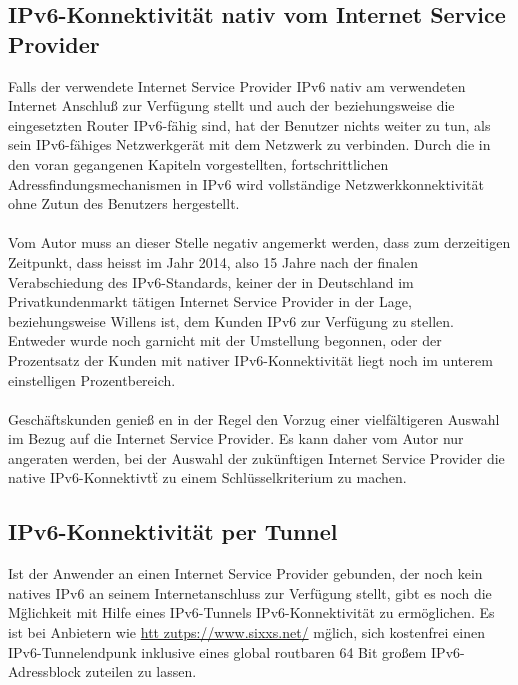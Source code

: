 \documentclass[a4paper,12pt]{scrartcl}
\begin{document}
\subsection{IPv6-Konnektivit\"at nativ vom Internet Service Provider}
Falls der verwendete Internet Service Provider IPv6 nativ am verwendeten Internet Anschlu{\ss} zur Verf\"ugung stellt und auch der beziehungsweise die eingesetzten Router IPv6-f\"ahig sind, hat der Benutzer nichts weiter zu tun, als sein IPv6-f\"ahiges Netzwerkger\"at mit dem Netzwerk zu verbinden. Durch die in den voran gegangenen Kapiteln vorgestellten, fortschrittlichen Adressfindungsmechanismen in IPv6 wird vollst\"andige Netzwerkkonnektivit\"at ohne Zutun des Benutzers hergestellt.\\
\\
Vom Autor muss an dieser Stelle negativ angemerkt werden, dass zum derzeitigen Zeitpunkt, dass heisst im Jahr 2014, also 15 Jahre nach der finalen Verabschiedung des IPv6-Standards,  keiner der in Deutschland im Privatkundenmarkt t\"atigen Internet Service Provider in der Lage, beziehungsweise Willens ist, dem Kunden IPv6 zur Verf\"ugung zu stellen. Entweder wurde noch garnicht mit der Umstellung begonnen, oder der Prozentsatz der Kunden mit nativer IPv6-Konnektivit\"at liegt noch im unterem einstelligen Prozentbereich.\\
\\
Gesch\"aftskunden genie{\ss} en in der Regel den Vorzug einer vielf\"altigeren Auswahl im Bezug auf die Internet Service Provider. Es kann daher vom Autor nur angeraten werden, bei der Auswahl der zuk\"unftigen Internet Service Provider die native IPv6-Konnektivt\"t zu einem Schl\"usselkriterium zu machen.

\subsection{IPv6-Konnektivit\"at per Tunnel}
Ist der Anwender an einen Internet Service Provider gebunden, der noch kein natives IPv6 an seinem Internetanschluss zur Verf\"ugung stellt, gibt es noch die M\"glichkeit mit Hilfe eines IPv6-Tunnels IPv6-Konnektivit\"at zu erm\"oglichen. Es ist bei Anbietern wie \url{htt zutps://www.sixxs.net/} m\"glich, sich kostenfrei einen IPv6-Tunnelendpunk inklusive eines global routbaren 64 Bit gro{\ss}em IPv6-Adressblock zuteilen zu lassen. 
\end{document}
